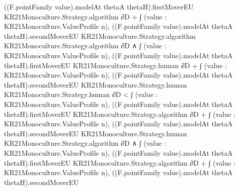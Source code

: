 \documentclass[10pt]{article}
\begin{document}
\begin{ReviewVerbatim}
                                                          ((F.pointFamily value).modelAt thetaA thetaH).firstMoverEU
                                                            KR21Monoculture.Strategy.algorithm ∂D +
                                                        ∫ (value : KR21Monoculture.ValueProfile n),
                                                          ((F.pointFamily value).modelAt thetaA thetaH).secondMoverEU
                                                            KR21Monoculture.Strategy.algorithm
                                                            KR21Monoculture.Strategy.algorithm ∂D ∧
                                                    ∫ (value : KR21Monoculture.ValueProfile n),
                                                            ((F.pointFamily value).modelAt thetaA thetaH).firstMoverEU
                                                              KR21Monoculture.Strategy.human ∂D +
                                                          ∫ (value : KR21Monoculture.ValueProfile n),
                                                            ((F.pointFamily value).modelAt thetaA thetaH).secondMoverEU
                                                              KR21Monoculture.Strategy.human
                                                              KR21Monoculture.Strategy.human ∂D <
                                                        ∫ (value : KR21Monoculture.ValueProfile n),
                                                            ((F.pointFamily value).modelAt thetaA thetaH).firstMoverEU
                                                              KR21Monoculture.Strategy.algorithm ∂D +
                                                          ∫ (value : KR21Monoculture.ValueProfile n),
                                                            ((F.pointFamily value).modelAt thetaA thetaH).secondMoverEU
                                                              KR21Monoculture.Strategy.human
                                                              KR21Monoculture.Strategy.algorithm ∂D ∧
                                                      ∫ (value : KR21Monoculture.ValueProfile n),
                                                            ((F.pointFamily value).modelAt thetaA thetaH).firstMoverEU
                                                              KR21Monoculture.Strategy.algorithm ∂D +
                                                          ∫ (value : KR21Monoculture.ValueProfile n),
                                                            ((F.pointFamily value).modelAt thetaA thetaH).secondMoverEU

\end{ReviewVerbatim}
\end{document}
